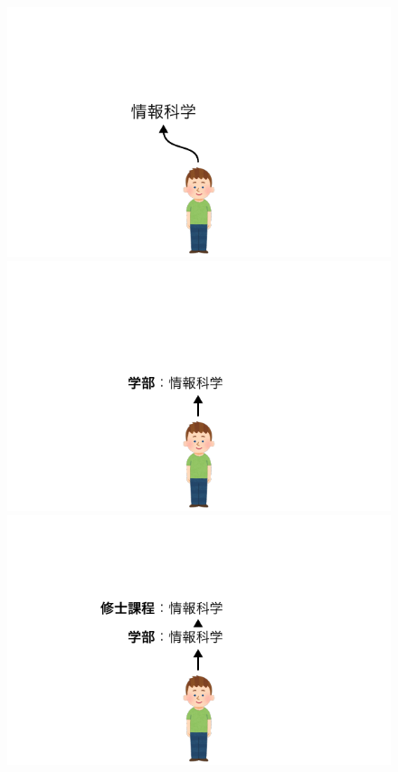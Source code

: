 \documentclass[lualatex,aspectratio=169]{beamer}
\begin{document}
\begin{frame}[t]
\begin{figure}
\begin{overprint}
            \begin{center}\includegraphics[width=0.8\linewidth]{./img/intro_5.pdf}\end{center}
            \begin{center}\includegraphics[width=0.8\linewidth]{./img/intro_6.pdf}\end{center}
            \begin{center}\includegraphics[width=0.8\linewidth]{./img/intro_7.pdf}\end{center}

\end{overprint}
\end{figure}
\end{frame}
\end{document}
